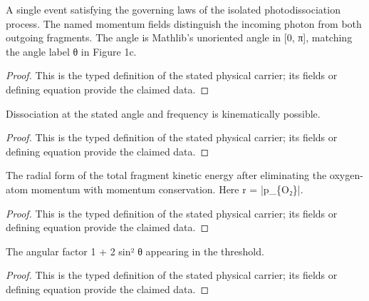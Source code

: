 \begin{definition}
  \label{def:physics:IPhO_2026_1_C_1:aux009}
  A single event satisfying the governing laws of the isolated photodissociation process. The named momentum fields distinguish the incoming photon from both outgoing fragments. The angle is Mathlib's unoriented angle in [0, π], matching the angle label θ in Figure 1c.
\end{definition}
\begin{proof}
  This is the typed definition of the stated physical carrier; its fields or defining equation provide the claimed data.
\end{proof}

\begin{definition}
  \label{def:physics:IPhO_2026_1_C_1:aux010}
  Dissociation at the stated angle and frequency is kinematically possible.
\end{definition}
\begin{proof}
  This is the typed definition of the stated physical carrier; its fields or defining equation provide the claimed data.
\end{proof}

\begin{definition}
  \label{def:physics:IPhO_2026_1_C_1:aux011}
  The radial form of the total fragment kinetic energy after eliminating the oxygen-atom momentum with momentum conservation. Here r = |p\_\{O₂\}|.
\end{definition}
\begin{proof}
  This is the typed definition of the stated physical carrier; its fields or defining equation provide the claimed data.
\end{proof}

\begin{definition}
  \label{def:physics:IPhO_2026_1_C_1:aux012}
  The angular factor 1 + 2 sin² θ appearing in the threshold.
\end{definition}
\begin{proof}
  This is the typed definition of the stated physical carrier; its fields or defining equation provide the claimed data.
\end{proof}

